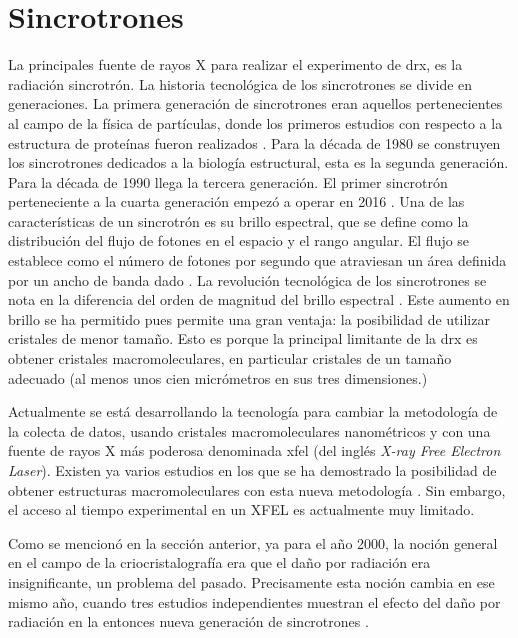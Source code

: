 \section{Sincrotrones}
La principales fuente de rayos X para realizar el experimento de \acrshort{drx}, es la radiación sincrotrón.
La historia tecnológica de los sincrotrones se divide en generaciones. La primera generación de sincrotrones eran aquellos pertenecientes al campo de la física de partículas, donde los primeros estudios con respecto a la estructura de proteínas fueron realizados . Para la década de 1980 se construyen los sincrotrones dedicados a la biología estructural, esta es la segunda generación. Para la década de 1990 llega la tercera generación. El primer sincrotrón perteneciente a la cuarta generación empezó a operar en 2016 . 
Una de las características de un sincrotrón es su brillo espectral, que se define como la distribución del flujo de fotones en el espacio y el rango angular. El flujo se establece como el número de fotones por segundo que atraviesan un área definida por un ancho de banda dado . La revolución tecnológica de los sincrotrones se nota en la diferencia del orden de magnitud del brillo espectral \cite{Willmott2019}. Este aumento en brillo se ha permitido pues permite una gran ventaja: la posibilidad de utilizar cristales de menor tamaño. Esto es porque la principal limitante de la \acrshort{drx} es obtener cristales macromoleculares, en particular cristales de un tamaño adecuado (al menos unos cien micrómetros en sus tres dimensiones.) 

Actualmente se está desarrollando la tecnología para cambiar la metodología de la colecta de datos, usando cristales macromoleculares nanométricos y con una fuente de rayos X más poderosa denominada \acrshort{xfel} (del inglés \emph{X-ray Free Electron Laser}). Existen ya varios estudios en los que se ha demostrado la posibilidad de obtener estructuras macromoleculares con esta nueva metodología . Sin embargo, el acceso al tiempo experimental en un XFEL es actualmente muy limitado.

Como se mencionó en la sección anterior, ya para el año 2000, la noción general en el campo de la criocristalografía era que el daño por radiación era insignificante, un problema del pasado. Precisamente esta noción cambia en ese mismo año, cuando tres estudios independientes muestran el efecto del daño por radiación en la entonces nueva generación de sincrotrones . 

